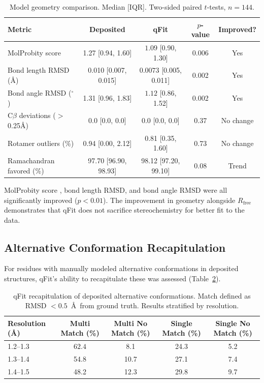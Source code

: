 \documentclass[11pt]{article}
\begin{document}
\begin{table}[H]
\centering
\caption{Model geometry comparison. Median [IQR]. Two-sided paired $t$-tests, $n = 144$.}
\label{tab:geometry}
\begin{tabular}{lcccc}
\toprule
Metric & Deposited & qFit & $p$-value & Improved? \\
\midrule
MolProbity score & 1.27 [0.94, 1.60] & $\mathbf{1.09}$ [0.90, 1.30] & 0.006 & Yes \\
Bond length RMSD (\AA) & 0.010 [0.007, 0.015] & $\mathbf{0.0073}$ [0.005, 0.011] & 0.002 & Yes \\
Bond angle RMSD ($^{\circ}$) & 1.31 [0.96, 1.83] & $\mathbf{1.12}$ [0.86, 1.52] & 0.002 & Yes \\
C$\beta$ deviations ($>$0.25\AA) & 0.0 [0.0, 0.0] & 0.0 [0.0, 0.0] & 0.37 & No change \\
Rotamer outliers (\%) & 0.94 [0.00, 2.12] & 0.81 [0.35, 1.60] & 0.73 & No change \\
Ramachandran favored (\%) & 97.70 [96.90, 98.93] & 98.12 [97.20, 99.10] & 0.08 & Trend \\
\bottomrule
\end{tabular}
\end{table}

MolProbity score \citep{molprobity_chen2010}, bond length RMSD, and bond angle RMSD were all significantly improved ($p < 0.01$). The improvement in geometry alongside $R_{\text{free}}$ demonstrates that qFit does not sacrifice stereochemistry for better fit to the data.

\subsection{Alternative Conformation Recapitulation}

For residues with manually modeled alternative conformations in deposited structures, qFit's ability to recapitulate these was assessed (Table~\ref{tab:recapitulation}).

\begin{table}[H]
\centering
\caption{qFit recapitulation of deposited alternative conformations. Match defined as RMSD $< 0.5$~\AA\ from ground truth. Results stratified by resolution.}
\label{tab:recapitulation}
\begin{tabular}{lcccc}
\toprule
Resolution (\AA) & Multi Match (\%) & Multi No Match (\%) & Single Match (\%) & Single No Match (\%) \\
\midrule
1.2--1.3 & $\mathbf{62.4}$ & 8.1 & 24.3 & 5.2 \\
1.3--1.4 & 54.8 & 10.7 & 27.1 & 7.4 \\
1.4--1.5 & 48.2 & 12.3 & 29.8 & 9.7 \\
\bottomrule
\end{tabular}
\end{table}
\end{document}
